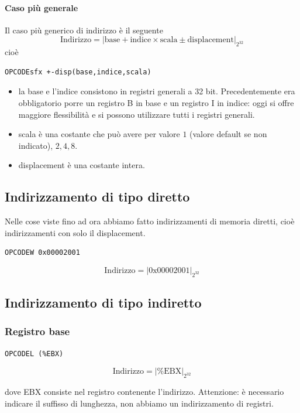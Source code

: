 \documentclass[11pt]{report}
\theoremstyle{definition}
\begin{document}
 \paragraph{Caso più generale} Il caso più generico di indirizzo è il seguente
 \[\text{Indirizzo}=\left|\text{base}+\text{indice}\times\text{scala} \pm \text{displacement}\right|_{2^{32}}\]
 cioè 
 \begin{verbatim}OPCODEsfx +-disp(base,indice,scala)\end{verbatim}
 \begin{itemize}
 	\item la base e l'indice consistono in registri generali a 32 bit. Precedentemente era obbligatorio porre un registro B in base e un registro I in indice: oggi si offre maggiore flessibilità e si possono utilizzare tutti i registri generali.
 	\item scala è una costante che può avere per valore $1$ (valore default se non indicato), $2,4,8$.
 	\item displacement è una costante intera. 
 \end{itemize}
 \subsection*{Indirizzamento di tipo diretto}
 Nelle cose viste fino ad ora abbiamo fatto indirizzamenti di memoria diretti, cioè indirizzamenti con solo il displacement.
 \begin{multicols}{2}
 \begin{verbatim}OPCODEW 0x00002001\end{verbatim}
 \[\text{Indirizzo}=\left| \text{0x00002001}\right|_{2^{32}}\]
 \end{multicols}
 \subsection*{Indirizzamento di tipo indiretto}
 \subsubsection*{Registro base} 
 \begin{multicols}{2}
 	\begin{verbatim}OPCODEL (%EBX)
\end{verbatim}
 	\[\text{Indirizzo}=\left|\text{\%EBX}\right|_{2^{32}}\]
 \end{multicols}
 \noindent dove EBX consiste nel registro contenente l'indirizzo. Attenzione: è necessario indicare il suffisso di lunghezza, non abbiamo un indirizzamento di registri.
 \clearpage 
\end{document}
